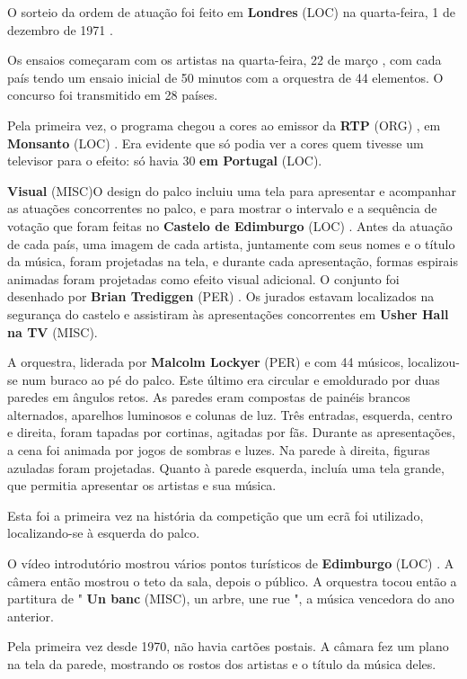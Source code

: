 \documentclass[12pt,a4paper]{article}
\begin{document}
O sorteio da ordem de atuação foi feito em \textbf{Londres} (LOC) na quarta-feira, 1 de dezembro de 1971 .

Os ensaios começaram com os artistas na quarta-feira, 22 de março , com cada país tendo um ensaio inicial de 50 minutos com a orquestra de 44 elementos. O concurso foi transmitido em 28 países.

Pela primeira vez, o programa chegou a cores ao emissor da \textbf{RTP} (ORG) , em \textbf{Monsanto} (LOC) . Era evidente que só podia ver a cores quem tivesse um televisor para o efeito: só havia 30 \textbf{em Portugal} (LOC).



\textbf{Visual} (MISC)O design do palco incluiu uma tela para apresentar e acompanhar as atuações concorrentes no palco, e para mostrar o intervalo e a sequência de votação que foram feitas no \textbf{Castelo de Edimburgo} (LOC) . Antes da atuação de cada país, uma imagem de cada artista, juntamente com seus nomes e o título da música, foram projetadas na tela, e durante cada apresentação, formas espirais animadas foram projetadas como efeito visual adicional. O conjunto foi desenhado por \textbf{Brian Trediggen} (PER) . Os jurados estavam localizados na segurança do castelo e assistiram às apresentações concorrentes em \textbf{Usher Hall na TV} (MISC).

A orquestra, liderada por \textbf{Malcolm Lockyer} (PER) e com 44 músicos, localizou-se num buraco ao pé do palco. Este último era circular e emoldurado por duas paredes em ângulos retos. As paredes eram compostas de painéis brancos alternados, aparelhos luminosos e colunas de luz. Três entradas, esquerda, centro e direita, foram tapadas por cortinas, agitadas por fãs. Durante as apresentações, a cena foi animada por jogos de sombras e luzes. Na parede à direita, figuras azuladas foram projetadas. Quanto à parede esquerda, incluía uma tela grande, que permitia apresentar os artistas e sua música.

Esta foi a primeira vez na história da competição que um ecrã foi utilizado, localizando-se à esquerda do palco.

O vídeo introdutório mostrou vários pontos turísticos de \textbf{Edimburgo} (LOC) . A câmera então mostrou o teto da sala, depois o público. A orquestra tocou então a partitura de " \textbf{Un banc} (MISC), un arbre, une rue ", a música vencedora do ano anterior.

Pela primeira vez desde 1970, não havia cartões postais. A câmara fez um plano na tela da parede, mostrando os rostos dos artistas e o título da música deles.
\end{document}
